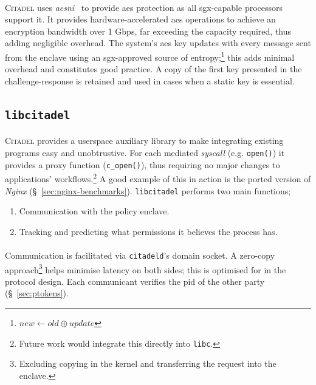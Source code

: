 \paragraph{} \textsc{Citadel} uses \textit{\acrshort{aesni}}~\cite{aesni} to provide \acrshort{aes} protection as all \acrshort{sgx}-capable processors support it. It provides hardware-accelerated \acrshort{aes} operations to achieve an encryption bandwidth over 1 Gbps, far exceeding the capacity required, thus adding negligible overhead. The system's \acrshort{aes} key updates with every message sent from the enclave using an \acrshort{sgx}-approved source of entropy;\footnote{$new \leftarrow old \oplus update$} this adds minimal overhead and constitutes good practice. A copy of the first key presented in the challenge-response is retained and used in cases when a static key is essential.

\subsection{\texttt{libcitadel}}
\label{sec:libcitadel}
\paragraph{} \textsc{Citadel} provides a userspace auxiliary library to make integrating existing programs easy and unobtrustive. For each mediated \textit{syscall} (e.g. \texttt{open()}) it provides a proxy function (\texttt{c\_open()}), thus requiring no major changes to applications' workflows.\footnote{Future work would integrate this directly into \texttt{libc}.} A good example of this in action is the ported version of \textit{Nginx} (§~\ref{sec:nginx-benchmarks}). \texttt{libcitadel} performs two main functions;
\begin{enumerate}
    \item Communication with the policy enclave.
    \item Tracking and predicting what permissions it believes the process has.
\end{enumerate}

\paragraph{} Communication is facilitated via \texttt{citadeld}'s domain socket. A zero-copy approach\footnote{Excluding copying in the kernel and transferring the request into the enclave.} helps minimise latency on both sides; this is optimised for in the protocol design. Each communicant verifies the \acrshort{pid} of the other party (§~\ref{sec:ptokens}).

